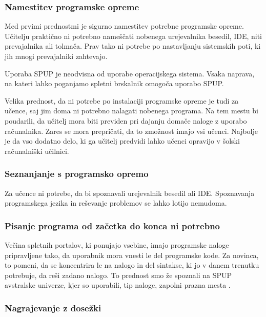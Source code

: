 \subsubsection{Namestitev programske opreme}
\label{sec:Namestitev_programske_opreme}

Med prvimi prednostmi je sigurno namestitev potrebne programske
opreme. Učitelju praktično ni potrebno nameščati nobenega urejevalnika
besedil, IDE, niti prevajalnika ali tolmača. Prav tako ni potrebe po
nastavljanju sistemskih poti, ki jih mnogi prevajalniki zahtevajo.

Uporaba SPUP je neodvisna od uporabe operacijskega sistema. Vsaka
naprava, na kateri lahko poganjamo spletni brskalnik omogoča uporabo
SPUP.

Velika prednost, da ni potrebe po instalaciji programske opreme je
tudi za učence, saj jim doma ni potrebno nalagati nobenega
programa. Na tem mestu bi poudarili, da učitelj mora biti previden pri
dajanju domače naloge z uporabo računalnika. Zares se mora prepričati,
da to zmožnost imajo vsi učenci. Najbolje je da vso dodatno delo, ki
ga učitelj predvidi lahko učenci opravijo v šolski računalniški
učilnici.

\subsubsection{Seznanjanje s programsko opremo}
\label{sec:Seznanjanje_s_prog_opremo}

Za učence ni potrebe, da bi spoznavali urejevalnik besedil ali
IDE. Spoznavanja programskega jezika in reševanje problemov se lahko
lotijo nemudoma.


\subsubsection{Pisanje programa od začetka do konca ni potrebno}
\label{sec:pisanj_celega_progama}

Večina spletnih portalov, ki ponujajo vsebine, imajo programske naloge
pripravljene tako, da uporabnik mora vnesti le del programske kode. Za
novinca, to pomeni, da se koncentrira le na nalogo in del sintakse, ki
jo v danem trenutku potrebuje, da reši zadano nalogo. To prednost smo
že spoznali na SPUP avstralske univerze, kjer so uporabili, tip
naloge, zapolni prazna mesta \cite{thesisAWebP}.

\subsubsection{Nagrajevanje z dosežki}
\label{sec:nagrajevanje_s_dosežkov}






